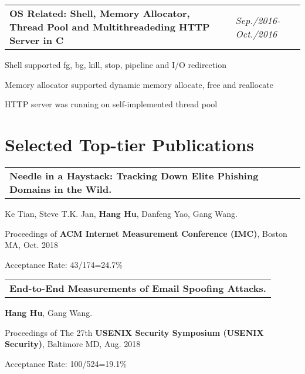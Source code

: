 \documentclass[a4paper,10pt]{article}
\newenvironment{packed_itemize}{
\begin{list}{\labelitemi}{\leftmargin=2em}
\setlength{\itemsep}{0pt}
\setlength{\parskip}{0pt}
\setlength{\parsep}{0pt}
\setlength{\headsep}{0pt}
\setlength{\topskip}{0pt}
\setlength{\topmargin}{0pt}
\setlength{\topsep}{0pt}
\setlength{\partopsep}{0pt}
}{\end{list}}
\begin{document}
\begin{tabular}{p{15cm}p{3cm}}
\textbf{OS Related: Shell, Memory Allocator, Thread Pool and Multithreadeding HTTP Server in C} & \emph{Sep./2016-Oct./2016} \\
\end{tabular}

\begin{packed_itemize}
\item Shell supported fg, bg, kill, stop, pipeline and I/O redirection \\
\item Memory allocator supported dynamic memory allocate, free and reallocate \\
\item HTTP server was running on self-implemented thread pool \\
\end{packed_itemize}





\section{Selected Top-tier Publications}

\vspace{-0.2cm}

\begin{tabular}{p{17.5cm}}
\textbf{Needle in a Haystack: Tracking Down Elite Phishing Domains in the Wild.}\\
\end{tabular}

\begin{packed_itemize}
\item Ke Tian, Steve T.K. Jan, \textbf{Hang Hu}, Danfeng Yao, Gang Wang.\\ 
\item Proceedings of \textbf{ACM Internet Measurement Conference (IMC)}, Boston MA, Oct. 2018\\
\item Acceptance Rate: 43/174=24.7\% \\
\end{packed_itemize}


\begin{tabular}{p{17.5cm}}
\textbf{End-to-End Measurements of Email Spoofing Attacks.}\\
\end{tabular}

\begin{packed_itemize}
\item \textbf{Hang Hu}, Gang Wang.\\ 
\item Proceedings of The 27th \textbf{USENIX Security Symposium (USENIX Security)}, Baltimore MD, Aug. 2018\\
\item Acceptance Rate: 100/524=19.1\% \\
\end{packed_itemize}
\end{document}
